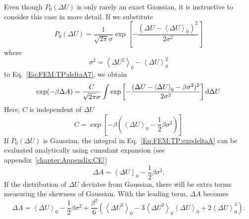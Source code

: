 Even though $P_{0}(\Delta U)$ is only rarely an exact Gaussian, it is instructive to consider this case in more detail. If we substitute
\begin{equation}
  P_{0}(\Delta U) = \frac{1}{\sqrt{2\pi}\sigma}\exp{\left[-\frac{(\Delta U - \left \langle \Delta U \right \rangle_{0})^2}{2\sigma^2}\right]}
  \label{Eq:FEM:TP:gaussian}
\end{equation}
where
\begin{equation}
  \sigma^2 = \left \langle \Delta U^2 \right \rangle_{0} - \left \langle \Delta U \right \rangle_{0}^2
  \label{Eq:FEM:TP:variance}
\end{equation}
to Eq.~\ref{Eq:FEM:TP:deltaA7}, we obtain
\begin{equation}
  \exp(-\beta \Delta A) = \frac{C}{\sqrt{2\pi}\sigma} \int \exp{\left[-\frac{(\Delta U - \left \langle \Delta U \right \rangle_{0} - \beta \sigma ^2)^2}{2\sigma^2}\right]} \mathop{}\!\mathrm{d}\Delta U
  \label{Eq:FEM:TP:expdeltaA}
\end{equation}
Here, $C$ is independent of $\Delta U$
\begin{equation}
  C = \exp{\left[-\beta \left(\left \langle \Delta U \right \rangle_{0} - \frac{1}{2} \beta \sigma ^2\right)\right]}
  \label{Eq:FEM:TP:C}
\end{equation}
If $P_{0}(\Delta U)$ is Gaussian, the integral in Eq.~\ref{Eq:FEM:TP:expdeltaA} can be evaluated analytically using cumulant expansion (see appendix~\ref{chapter:Appendix:CE})
\begin{equation}
  \Delta A = \left< \Delta U \right>_{0} - \frac{1}{2} \beta \sigma ^2.
  \label{Eq:FEM:TP:deltaA8}
\end{equation}
If the distribution of $\Delta U$ deviates from Gaussian, there will be extra terms measuring the skewness of Gaussian. With the leading term, $\Delta A$ becomes
\begin{equation}
  \Delta A = \left< \Delta U \right>_{0} - \frac{1}{2} \beta \sigma ^2 + \frac{\beta^2}{6} \left(\left<\Delta U^3\right>_0-3\left<\Delta U^2\right>_0\left<\Delta U\right>_0+2\left<\Delta U\right>_0^3\right).
  \label{Eq:FEM:TP:deltaA9}
\end{equation}
